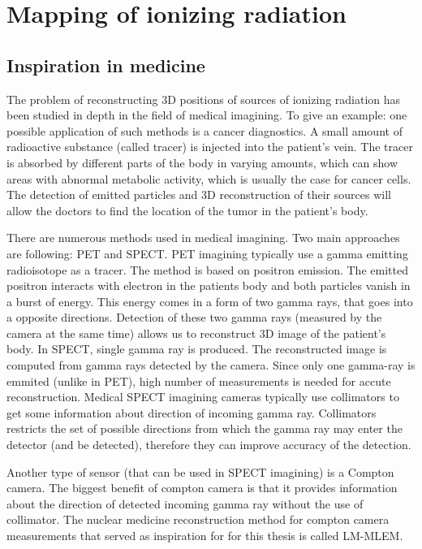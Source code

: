 
\chapter{Mapping of ionizing radiation}


\section{Inspiration in medicine}
The problem of reconstructing 3D positions of sources of ionizing radiation has been studied in depth in the field of medical imagining.
To give an example: one possible application of such methods is a cancer diagnostics.
A small amount of radioactive substance (called tracer) is injected into the patient's vein.
The tracer is absorbed by different parts of the body in varying amounts, which can show areas with abnormal metabolic activity, which is usually the case for cancer cells.
The detection of emitted particles and 3D reconstruction of their sources will allow the doctors to find the location of the tumor in the patient's body.

There are numerous methods used in medical imagining. 
Two main approaches are following: \ac{PET} and \ac{SPECT}.
\ac{PET} imagining typically use a gamma emitting radioisotope as a tracer.  
The method is based on positron emission. 
The emitted positron interacts with electron in the patients body and both particles vanish in a burst of energy. 
This energy comes in a form of two gamma rays, that goes into a opposite directions.
Detection of these two gamma rays (measured by the camera at the same time) allows us to reconstruct 3D image of the patient's body.
In \ac{SPECT}, single gamma ray is produced. 
The reconstructed image is computed from gamma rays detected by the camera.
Since only one gamma-ray is emmited (unlike in \ac{PET}), high number of measurements is needed for accute reconstruction.
Medical \ac{SPECT} imagining cameras typically use collimators to get some information about direction of incoming gamma ray.
Collimators restricts the set of possible directions from which the gamma ray may enter the detector (and be detected), therefore they can improve accuracy of the detection.

Another type of sensor (that can be used in \ac{SPECT} imagining) is a Compton camera.
The biggest benefit of compton camera is that it provides information about the direction of detected incoming gamma ray without the use of collimator.
The nuclear medicine reconstruction method for compton camera measurements that served as inspiration for for this thesis is called \ac{LM-MLEM}.

